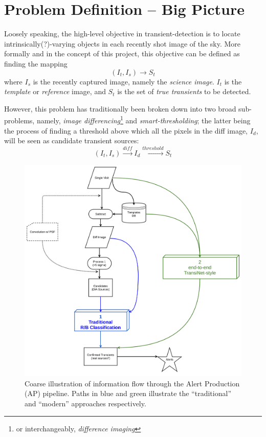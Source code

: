 \section{Problem Definition -- Big Picture}
\label{sec:definition}

Loosely speaking, the high-level objective in transient-detection is to locate intrinsically(?)-varying objects in each recently shot image of the sky.
More formally and in the concept of this project, this objective can be defined as finding the mapping
\begin{equation}
  \label{eq:def1}
  (I_t,I_s) \longrightarrow S_t 
\end{equation}
where $I_s$ is the recently captured image, namely the \emph{science image}. $I_t$ is the \emph{template} or \emph{reference} image, and $S_t$ is the set of \emph{true transients} to be detected.


However, this problem has traditionally been broken down into two broad sub-problems, namely, \emph{image differencing}\footnote{or interchangeably, \emph{difference imaging}} and \emph{smart-thresholding}; the latter being the process of finding a threshold above which all the pixels in the diff image, $I_d$, will be seen as candidate transient sources:
\begin{equation}
  \label{eq:def2}
  (I_t,I_s) \xrightarrow{diff} I_d \xrightarrow{threshold} S_t 
\end{equation}

\begin{figure}[h]
  \centering
  \includegraphics[width=.8\textwidth]{material/diagram}
  \caption{Coarse illustration of information flow through the Alert Production (AP) pipeline. Paths in blue and green illustrate the ``traditional'' and ``modern'' approaches respectively.}
  \label{fig:diagram}
\end{figure}


